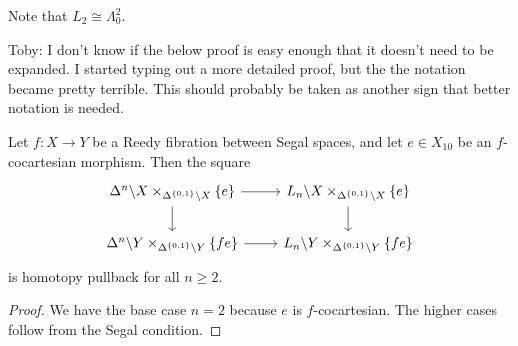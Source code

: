 \documentclass[main.tex]{subfiles}
\begin{document}
Note that $L_{2} \cong \Lambda^{2}_{0}$.


\begin{note}
  Toby: I don't know if the below proof is easy enough that it doesn't need to be expanded. I started typing out a more detailed proof, but the the notation became pretty terrible. This should probably be taken as another sign that better notation is needed.
\end{note}

\begin{proposition}
  \label{prop:only_lowest_lifting_condition_is_necessary}
  Let $f\colon X \to Y$ be a Reedy fibration between Segal spaces, and let $e \in X_{10}$ be an $f$-cocartesian morphism. Then the square
  \begin{equation*}
    \begin{tikzcd}
      \Delta^{n} \backslash X \times_{\Delta^{\{0, 1\}} \backslash X} \{e\}
      \arrow[r]
      \arrow[d]
      & L_{n} \backslash X \times_{\Delta^{\{0, 1\}} \backslash X} \{e\}
      \arrow[d]
      \\
      \Delta^{n} \backslash Y \times_{\Delta^{\{0, 1\}} \backslash Y} \{fe\}
      \arrow[r]
      & L_{n} \backslash Y \times_{\Delta^{\{0, 1\}} \backslash Y} \{fe\}
    \end{tikzcd}
  \end{equation*}
  is homotopy pullback for all $n \geq 2$.
\end{proposition}
\begin{proof}
  We have the base case $n = 2$ because $e$ is $f$-cocartesian. The higher cases follow from the Segal condition.

\end{proof}
\end{document}
